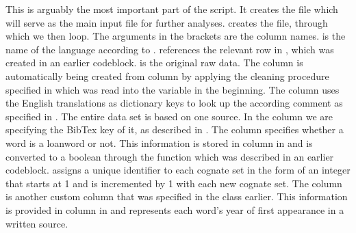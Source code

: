 \documentclass[letterpaper,10pt,english]{sphinxmanual}
\begin{document}
\sphinxAtStartPar
This is arguably the most important part of the script. It creates the file
 which will serve as the main input file for further
analyses.  creates the file, through which
we then loop. The arguments in the brackets are the column names.
 is the name of the language according to
.  references the relevant row in
, which was created in an earlier code\sphinxhyphen{}block.  is
the original raw data. The column  is automatically being created from
column  by applying the cleaning procedure specified in
 which was read into the
 variable in the beginning. The column
 uses the English translations as dictionary keys to look up the
according comment as specified in . The entire data set is
based on one source. In the column  we are specifying the BibTex key
of it, as described in . The column  specifies
whether a word is a loanword or not. This information is stored in column
 in  and is converted to a boolean through the
function  which was described in an earlier code\sphinxhyphen{}block.
 assigns a unique identifier to each cognate set in the form of an
integer that starts at 1 and is incremented by 1 with each new cognate set.
The column  is another custom column that was specified in the
 class earlier. This information is provided in column
 in  and represents each word’s year of first
appearance in a written source.
\end{document}
